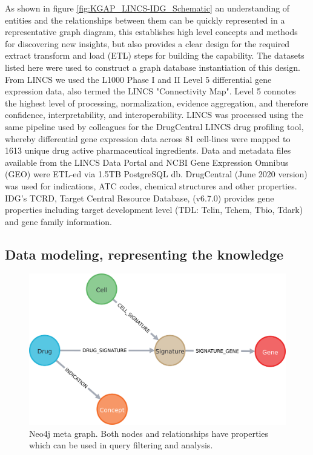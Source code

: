 As shown in figure \ref{fig:KGAP_LINCS-IDG_Schematic} an understanding of entities and the relationships between them can be quickly represented in a representative graph diagram, this establishes high level concepts and methods for discovering new insights, but also provides a clear design for the required extract transform and load (ETL) steps for building the capability.  The datasets listed here were used to construct a graph database instantiation of this design. From LINCS we used the L1000 Phase I and II Level 5 differential gene expression data, also termed the LINCS "Connectivity Map"\cite{Subramanian2017-sx}. Level 5 connotes the highest level of processing, normalization, evidence aggregation, and therefore confidence, interpretability, and interoperability. LINCS was processed using the same pipeline used by colleagues for the DrugCentral LINCS drug profiling tool, whereby differential gene expression data across 81 cell-lines were mapped to 1613 unique drug active pharmaceutical ingredients\cite{Avram2021-wd}.  Data and metadata files available from the LINCS Data Portal and NCBI Gene Expression Omnibus (GEO) were ETL-ed via 1.5TB PostgreSQL db. DrugCentral\cite{Avram2021-wd} (June 2020 version) was used for indications, ATC codes, chemical structures and other properties. IDG's TCRD, Target Central Resource Database\cite{IDG-KMC_Illuminating_the_Druggable_Genome_Knowledge_Management_Center_undated-pn}, (v6.7.0) provides gene properties including target development level (TDL: Tclin, Tchem, Tbio, Tdark) and gene family information.

\subsection{Data modeling, representing the knowledge}

\begin{figure}
	\includegraphics[width=\textwidth]{figures/kgap/KGAP_neo4jmetagraph.png}
	\caption{Neo4j meta graph. Both nodes and relationships have properties which can be used in query filtering and analysis.}
	\label{fig:neo4jmetagraph}
\end{figure}

